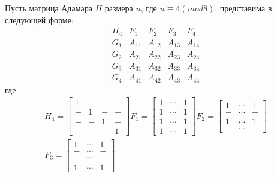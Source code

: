 \begin{Df}\normalfont\label{df:switch4}
    Пусть матрица Адамара $H$ размера $n$, где $n \equiv 4(mod8)$, представима в следующей форме:\\
    \begin{equation}\label{eq:m_4mod8}
        \begin{bmatrix}
            H_4 & F_1 & F_2 & F_3 & F_4 \\
            G_1 & A_{11} & A_{12} & A_{13} & A_{14} \\
            G_2 & A_{21} & A_{22} & A_{23} & A_{24} \\
            G_3 & A_{31} & A_{32} & A_{33} & A_{34} \\
            G_4 & A_{41} & A_{42} & A_{43} & A_{44}
        \end{bmatrix}
    \end{equation}
    где\\
    \begin{gather*}
        H_4 =
        \begin{bmatrix}
            1 & - & - & - \\
            - & 1 & - & - \\
            - & - & 1 & - \\
            - & - & - & 1
        \end{bmatrix}
        F_1 =
        \begin{bmatrix}
            1 & \cdots & 1 \\
            1 & \cdots & 1 \\
            1 & \cdots & 1 \\
            1 & \cdots & 1
        \end{bmatrix}
        F_2 =
        \begin{bmatrix}
            1 & \cdots & 1 \\
            - & \cdots & - \\
            1 & \cdots & 1 \\
            - & \cdots & -
        \end{bmatrix}
        \\
        F_3 = \begin{bmatrix}
            1 & \cdots & 1 \\
            - & \cdots & - \\
            - & \cdots & - \\
            1 & \cdots & 1
        \end{bmatrix}

\end{gather*}
\end{Df}
